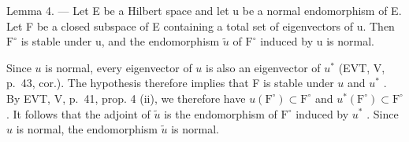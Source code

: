 Lemma 4. — Let E be a Hilbert space and let u be a normal endomorphism of E. Let F be a closed subspace of E containing a total set of eigenvectors of u. Then \(\mathrm{F}^{\circ}\) is stable under u, and the endomorphism \(\widetilde{u}\) of \(\mathrm{F}^{\circ}\) induced by u is normal.

Since \(u\) is normal, every eigenvector of \(u\) is also an eigenvector of \(u^{*}\) (EVT, V, p.~43, cor.). The hypothesis therefore implies that F is stable under \(u\) and \(u^{*}\) . By EVT, V, p.~41, prop. 4 (ii), we therefore have \(u(\mathrm{F}^{\circ}) \subset \mathrm{F}^{\circ}\) and \(u^{*}(\mathrm{F}^{\circ}) \subset \mathrm{F}^{\circ}\) . It follows that the adjoint of \(\widetilde{u}\) is the endomorphism of \(\mathrm{F}^{\circ}\) induced by \(u^{*}\) . Since \(u\) is normal, the endomorphism \(\widetilde{u}\) is normal.

